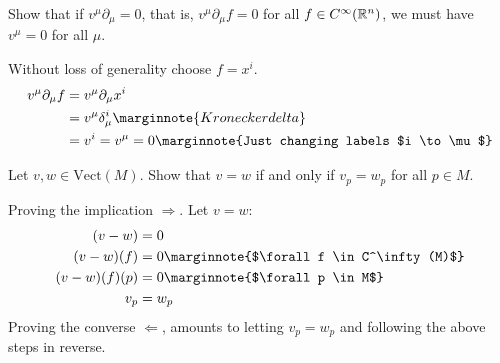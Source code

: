 \documentclass[10pt]{article}
\begin{document}
\begin{example}\label{b1e9}
	Show that if $v^\mu\partial_\mu = 0$, that is, 
	$v^\mu\partial_\mu f = 0$ for all $f \in C^\infty(\mathbb{R}^n)$, we must have $v^\mu = 0$ for all $\mu$.
\end{example}
\sol Without loss of generality choose $f = x^i$.
$$
\begin{aligned}
	v^\mu \partial_\mu f &= v^\mu \partial_\mu x^i\\
	&= v^\mu \delta_\mu^i\marginnote{Kronecker delta}\\
	&= v^i = v^\mu = 0\marginnote{Just changing labels $i \to \mu$}
\end{aligned}
$$


\begin{example}\label{b1e10}
	Let $v,w \in \text{Vect}(M)$. Show that $v = w$ if and only if $v_p = w_p$
	for all $p \in M$.
\end{example}
\sol Proving the implication $\Rightarrow$. Let $v=w$:
$$
	\begin{aligned}
		(v-w) &= 0\\
		(v-w)(f) &= 0 \marginnote{$\forall f \in C^\infty(M)$}\\
		(v-w)(f)(p) &= 0 \marginnote{$\forall p \in M$}\\
		v_p &= w_p
	\end{aligned}
$$
Proving the converse $\Leftarrow$, amounts to letting $v_p = w_p$ and following the above steps in reverse.
\end{document}
